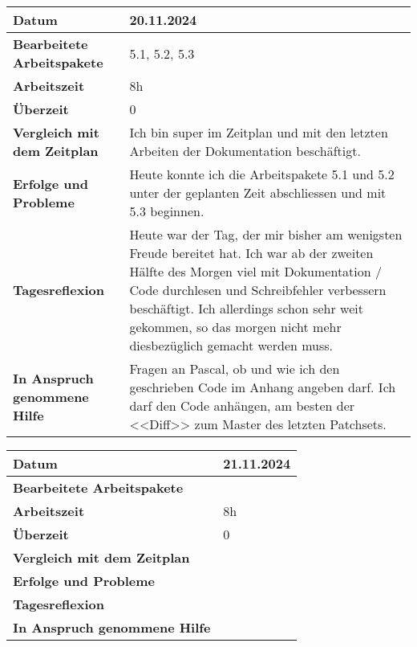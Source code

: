 \begin{longtable}{p{}|p{}}
	\hline
	\textbf{Datum}                       & 20.11.2024 \\
	\hline
	\textbf{Bearbeitete Arbeitspakete}   & 5.1, 5.2, 5.3\\
	\hline
	\textbf{Arbeitszeit}                 & 8h \\
	\hline
	\textbf{Überzeit}                    & 0 \\
	\hline
	\textbf{Vergleich mit dem Zeitplan}  & Ich bin super im Zeitplan und mit den letzten Arbeiten der Dokumentation beschäftigt. \\
	\hline
	\textbf{Erfolge und Probleme}        & Heute konnte ich die Arbeitspakete 5.1 und 5.2 unter der geplanten Zeit abschliessen und mit 5.3 beginnen. 
	\\
	\hline
	\textbf{Tagesreflexion}              & Heute war der Tag, der mir bisher am wenigsten Freude bereitet hat. Ich war ab der zweiten Hälfte des Morgen viel mit Dokumentation / Code durchlesen und Schreibfehler verbessern beschäftigt. Ich allerdings schon sehr weit gekommen, so das morgen nicht mehr diesbezüglich gemacht werden muss.
	\\
	\hline
	\textbf{In Anspruch genommene Hilfe} & Fragen an Pascal, ob und wie ich den geschrieben Code im Anhang angeben darf. Ich darf den Code anhängen, am besten der <<Diff>> zum Master des letzten Patchsets.\\
	\hline
\end{longtable}\label{tab:arbeitsprotokoll-tag9}
\newpage

\begin{longtable}{p{}|p{}}
	\hline
	\textbf{Datum}                       & 21.11.2024 \\
	\hline
	\textbf{Bearbeitete Arbeitspakete}   &  \\
	\hline
	\textbf{Arbeitszeit}                 & 8h \\
	\hline
	\textbf{Überzeit}                    & 0 \\
	\hline
	\textbf{Vergleich mit dem Zeitplan}  & 
	\\
	\hline
	\textbf{Erfolge und Probleme}        & 
	\\
	\hline
	\textbf{Tagesreflexion}              & 
	\\
	\hline
	\textbf{In Anspruch genommene Hilfe} & \\
	\hline
\end{longtable}\label{tab:arbeitsprotokoll-tag10}
\newpage


